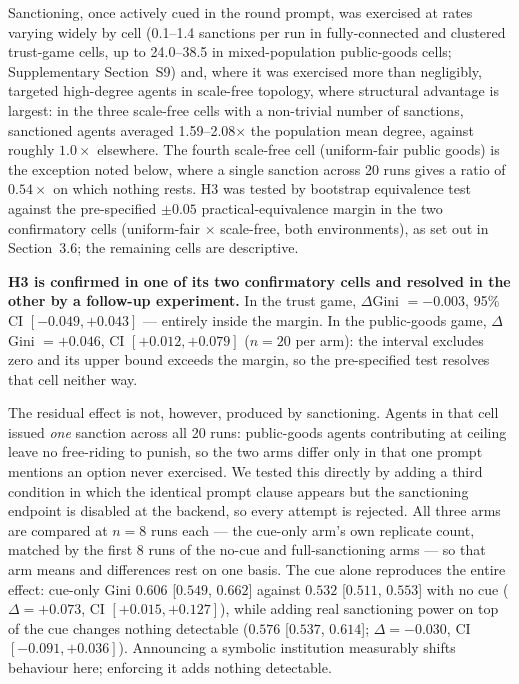 \documentclass[11pt,a4paper]{article}
\begin{document}
Sanctioning, once actively cued in the round prompt, was exercised at
rates varying widely by cell (0.1--1.4 sanctions per run in
fully-connected and clustered trust-game cells, up to 24.0--38.5 in
mixed-population public-goods cells; Supplementary Section~S9)
and, where it was exercised
more than negligibly, targeted high-degree agents in scale-free
topology, where structural advantage is largest: in the three
scale-free cells with a non-trivial number of sanctions, sanctioned
agents averaged 1.59--2.08$\times$ the population mean degree, against
roughly $1.0\times$ elsewhere. The fourth scale-free cell
(uniform-fair public goods) is the exception noted below, where a
single sanction across 20 runs gives a ratio of $0.54\times$ on which
nothing rests.
H3 was tested by bootstrap equivalence test
against the pre-specified $\pm0.05$ practical-equivalence margin in
the two confirmatory cells (uniform-fair $\times$ scale-free, both
environments), as set out in Section~3.6; the remaining cells are
descriptive.

\textbf{H3 is confirmed in one of its two confirmatory cells and
resolved in the other by a follow-up experiment.} In the trust game,
$\Delta$Gini $=-0.003$, 95\% CI $[-0.049, +0.043]$ --- entirely inside
the margin. In the public-goods game, $\Delta$Gini $=+0.046$, CI
$[+0.012, +0.079]$ ($n=20$ per arm): the interval excludes zero and
its upper bound exceeds the margin, so the pre-specified test resolves
that cell neither way.

The residual effect is not, however, produced by sanctioning. Agents
in that cell issued \emph{one} sanction across all 20 runs:
public-goods agents contributing at ceiling leave no free-riding to
punish, so the two arms differ only in that one prompt mentions an
option never exercised. We tested this directly by adding a third
condition in which the identical prompt clause appears but the
sanctioning endpoint is disabled at the backend, so every attempt is
rejected. All three arms are compared at $n=8$ runs each --- the
cue-only arm's own replicate count, matched by the first 8 runs of the
no-cue and full-sanctioning arms --- so that arm means and differences
rest on one basis. The cue alone reproduces the entire effect:
cue-only Gini $0.606$ [$0.549$, $0.662$] against $0.532$
[$0.511$, $0.553$] with no cue ($\Delta = +0.073$, CI
$[+0.015, +0.127]$), while adding real sanctioning power on top of the
cue changes nothing detectable ($0.576$ [$0.537$, $0.614$];
$\Delta = -0.030$, CI $[-0.091, +0.036]$).
Announcing a symbolic institution measurably
shifts behaviour here; enforcing it adds nothing detectable.
\end{document}
